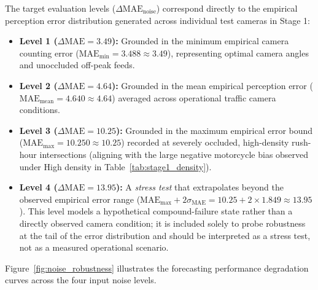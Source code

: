 \documentclass[preprint,12pt]{elsarticle}
\begin{document}
The target evaluation levels ($\Delta \text{MAE}_{\text{noise}}$) correspond directly to the empirical perception error distribution generated across individual test cameras in Stage 1:
\begin{itemize}
    \item \textbf{Level 1 ($\Delta \text{MAE} = 3.49$):} Grounded in the minimum empirical camera counting error ($\text{MAE}_{\min} = 3.488 \approx 3.49$), representing optimal camera angles and unoccluded off-peak feeds.
    \item \textbf{Level 2 ($\Delta \text{MAE} = 4.64$):} Grounded in the mean empirical perception error ($\text{MAE}_{\text{mean}} = 4.640 \approx 4.64$) averaged across operational traffic camera conditions.
    \item \textbf{Level 3 ($\Delta \text{MAE} = 10.25$):} Grounded in the maximum empirical error bound ($\text{MAE}_{\max} = 10.250 \approx 10.25$) recorded at severely occluded, high-density rush-hour intersections (aligning with the large negative motorcycle bias observed under High density in Table~\ref{tab:stage1_density}).
    \item \textbf{Level 4 ($\Delta \text{MAE} = 13.95$):} A \emph{stress test} that extrapolates beyond the observed empirical error range ($\text{MAE}_{\max} + 2\sigma_{\text{MAE}} = 10.25 + 2 \times 1.849 \approx 13.95$). This level models a hypothetical compound-failure state rather than a directly observed camera condition; it is included solely to probe robustness at the tail of the error distribution and should be interpreted as a stress test, not as a measured operational scenario.
\end{itemize}

Figure~\ref{fig:noise_robustness} illustrates the forecasting performance degradation curves across the four input noise levels.
\end{document}
